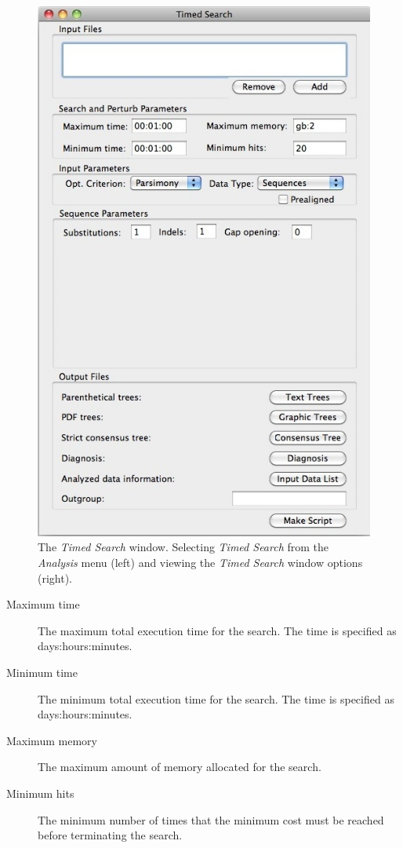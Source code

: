 {\begin{figure}
\begin{minipage}[c]{0.52\textwidth}
\includegraphics[width=\textwidth]{doc/figures/timedsearch_window.jpg}
\end{minipage}

\caption{The \emph{Timed Search} window. Selecting \emph{Timed Search} 
from the \emph{Analysis} menu (left) and viewing the \emph{Timed Search} 
window options (right).}
\label{fig:timed_search}
\end{figure}

\begin{description}
\item[Maximum time] The maximum total execution time for the search. 
The time is specified as days:hours:minutes.
\item[Minimum time] The minimum total execution time for the search. 
The time is specified as days:hours:minutes.
\item[Maximum memory] The maximum amount of memory allocated 
for the search.
\item[Minimum hits] The minimum number of times that the minimum 
cost must be reached before terminating the search.
\end{description}

}
